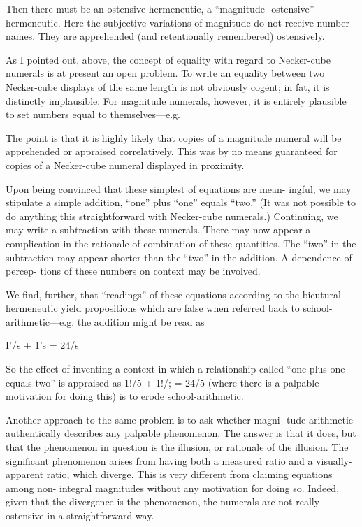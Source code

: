 Then there must be an ostensive hermeneutic, a “magnitude- 
ostensive” hermeneutic. Here the subjective variations of magnitude do 
not receive number-names. They are apprehended (and retentionally 
remembered) ostensively. 

As I pointed out, above, the concept of equality with regard to 
Necker-cube numerals is at present an open problem. To write an 
equality between two Necker-cube displays of the same length is not 
obviously cogent; in fat, it is distinctly implausible. For magnitude 
numerals, however, it is entirely plausible to set numbers equal to 
themselves—e.g. 


The point is that it is highly likely that copies of a magnitude numeral 
will be apprehended or appraised correlatively. This was by no means 
guaranteed for copies of a Necker-cube numeral displayed in proximity. 


Upon being convinced that these simplest of equations are mean- 
ingful, we may stipulate a simple addition, “one” plus “one” equals 
“two.” (It was not possible to do anything this straightforward with 
Necker-cube numerals.) Continuing, we may write a subtraction with 
these numerals. There may now appear a complication in the rationale 
of combination of these quantities. The “two” in the subtraction may 
appear shorter than the “two” in the addition. A dependence of percep- 
tions of these numbers on context may be involved. 

We find, further, that “readings” of these equations according to 
the bicutural hermeneutic yield propositions which are false when 
referred back to school-arithmetic—e.g. the addition might be read as 


I'/s + 1's = 24/s 


So the effect of inventing a context in which a relationship called “one 
plus one equals two” is appraised as 1!/5 + 1!/; = 24/5 (where there is a 
palpable motivation for doing this) is to erode school-arithmetic. 

Another approach to the same problem is to ask whether magni- 
tude arithmetic authentically describes any palpable phenomenon. The 
answer is that it does, but that the phenomenon in question is the 
illusion, or rationale of the illusion. The significant phenomenon arises 
from having both a measured ratio and a visually-apparent ratio, which 
diverge. This is very different from claiming equations among non- 
integral magnitudes without any motivation for doing so. Indeed, given 
that the divergence is the phenomenon, the numerals are not really 
ostensive in a straightforward way. 

